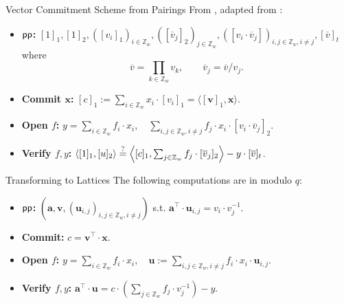 \begin{frame}{Vector Commitment Scheme from Pairings}
	From \cite{AlbrechtCLMT22}, adapted from \cite{CatalanoF13, LibertRY16,LaiM19}:
	\begin{itemize}
		\item \textbf{$\textsf{pp}$:} $[1]_1, [1]_2, ([v_i]_1)_{i\in \mathbb{Z}_w}, ([\overline{v}_j]_2)_{j \in \mathbb{Z}_w}, ([v_i \cdot \overline{v}_j])_{i, j \in \mathbb{Z}_w, i\not=j}, [\overline{v}]_t$ where 
		\begin{equation*}
			\overline{v} = \prod_{k \in \mathbb{Z}_w}v_k,\qquad \overline{v}_j = \overline{v}/v_j.
		\end{equation*}
		\item \textbf{Commit $\mathbf{x}$:} $[c]_1 := \sum_{i \in \mathbb{Z}_w} x_i \cdot [v_i]_1 = \langle[\mathbf{v}]_1, \mathbf{x}\rangle$.
		\item \textbf{Open $f$:} $y = \sum_{i \in \mathbb{Z}_w}f_i\cdot x_i,\quad \sum_{i,j \in \mathbb{Z}_w, i\not=j}f_j\cdot x_i\cdot[v_i\cdot\overline{v}_j]_2$.
		\item \textbf{Verify $f, y$:} $\langle[1]_1, [u]_2\rangle \stackrel{?}{=} \left\langle[c]_1, \sum_{j \in \mathbb{Z}_w}f_j\cdot [\overline{v}_j]_2\right\rangle - y \cdot [\overline{v}]_t$.
	\end{itemize}
\end{frame}
\begin{frame}{Transforming to Lattices}
	The following computations are in modulo $q$:
	\begin{itemize}
		\item \textbf{$\textsf{pp}$:} $\left(\mathbf{a}, \mathbf{v}, (\mathbf{u}_{i,j})_{i,j\in \mathbb{Z}_w, i\not=j}\right)$ s.t. $\mathbf{a}^\top\cdot \mathbf{u}_{i,j} = v_i \cdot v_j^{-1}$.
		\item \textbf{Commit:} $c = \mathbf{v}^\top\cdot\mathbf{x}$.
		\item \textbf{Open $f$:} $y = \sum_{i \in \mathbb{Z}_w}f_i\cdot x_i,\quad \mathbf{u}:=\sum_{i,j \in \mathbb{Z}_w, i\not=j}f_i\cdot x_i\cdot \mathbf{u}_{i,j}$.
		\item \textbf{Verify $f, y$:} $\mathbf{a}^\top\cdot\mathbf{u} = c\cdot \left(\sum_{j \in \mathbb{Z}_w}f_j\cdot v_j^{-1}\right) -y.$
	\end{itemize}
\end{frame}
